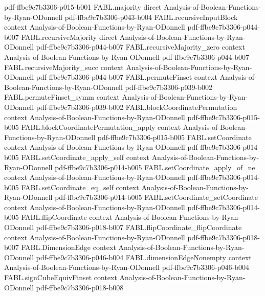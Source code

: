 \begin{theorem}
  {pdf-ffbe9c7b3306-p015-b001}
\proofstep
  {FABL.majority}
  {direct}
  {Analysis-of-Boolean-Functions-by-Ryan-ODonnell}
  {pdf-ffbe9c7b3306-p043-b004}
\proofstep
  {FABL.recursiveInputBlock}
  {context}
  {Analysis-of-Boolean-Functions-by-Ryan-ODonnell}
  {pdf-ffbe9c7b3306-p044-b007}
\proofstep
  {FABL.recursiveMajority}
  {direct}
  {Analysis-of-Boolean-Functions-by-Ryan-ODonnell}
  {pdf-ffbe9c7b3306-p044-b007}
\proofstep
  {FABL.recursiveMajority_zero}
  {context}
  {Analysis-of-Boolean-Functions-by-Ryan-ODonnell}
  {pdf-ffbe9c7b3306-p044-b007}
\proofstep
  {FABL.recursiveMajority_succ}
  {context}
  {Analysis-of-Boolean-Functions-by-Ryan-ODonnell}
  {pdf-ffbe9c7b3306-p044-b007}
\proofstep
  {FABL.permuteFinset}
  {context}
  {Analysis-of-Boolean-Functions-by-Ryan-ODonnell}
  {pdf-ffbe9c7b3306-p039-b002}
\proofstep
  {FABL.permuteFinset_symm}
  {context}
  {Analysis-of-Boolean-Functions-by-Ryan-ODonnell}
  {pdf-ffbe9c7b3306-p039-b002}
\proofstep
  {FABL.blockCoordinatePermutation}
  {context}
  {Analysis-of-Boolean-Functions-by-Ryan-ODonnell}
  {pdf-ffbe9c7b3306-p015-b005}
\proofstep
  {FABL.blockCoordinatePermutation_apply}
  {context}
  {Analysis-of-Boolean-Functions-by-Ryan-ODonnell}
  {pdf-ffbe9c7b3306-p015-b005}
\proofstep
  {FABL.setCoordinate}
  {context}
  {Analysis-of-Boolean-Functions-by-Ryan-ODonnell}
  {pdf-ffbe9c7b3306-p014-b005}
\proofstep
  {FABL.setCoordinate_apply_self}
  {context}
  {Analysis-of-Boolean-Functions-by-Ryan-ODonnell}
  {pdf-ffbe9c7b3306-p014-b005}
\proofstep
  {FABL.setCoordinate_apply_of_ne}
  {context}
  {Analysis-of-Boolean-Functions-by-Ryan-ODonnell}
  {pdf-ffbe9c7b3306-p014-b005}
\proofstep
  {FABL.setCoordinate_eq_self}
  {context}
  {Analysis-of-Boolean-Functions-by-Ryan-ODonnell}
  {pdf-ffbe9c7b3306-p014-b005}
\proofstep
  {FABL.setCoordinate_setCoordinate}
  {context}
  {Analysis-of-Boolean-Functions-by-Ryan-ODonnell}
  {pdf-ffbe9c7b3306-p014-b005}
\proofstep
  {FABL.flipCoordinate}
  {context}
  {Analysis-of-Boolean-Functions-by-Ryan-ODonnell}
  {pdf-ffbe9c7b3306-p018-b007}
\proofstep
  {FABL.flipCoordinate_flipCoordinate}
  {context}
  {Analysis-of-Boolean-Functions-by-Ryan-ODonnell}
  {pdf-ffbe9c7b3306-p018-b007}
\proofstep
  {FABL.DimensionEdge}
  {context}
  {Analysis-of-Boolean-Functions-by-Ryan-ODonnell}
  {pdf-ffbe9c7b3306-p046-b004}
\proofstep
  {FABL.dimensionEdgeNonempty}
  {context}
  {Analysis-of-Boolean-Functions-by-Ryan-ODonnell}
  {pdf-ffbe9c7b3306-p046-b004}
\proofstep
  {FABL.signCubeEquivFinset}
  {context}
  {Analysis-of-Boolean-Functions-by-Ryan-ODonnell}
  {pdf-ffbe9c7b3306-p018-b008}
\proofstep

\end{theorem}
